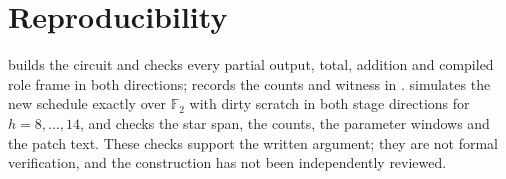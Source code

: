 \documentclass[11pt]{article}
\begin{document}
\section{Reproducibility}
 builds the circuit and checks every partial
output, total, addition and compiled role frame in both directions;
 records the counts and witness in
. 
simulates the new schedule exactly over $\mathbb F_2$ with dirty scratch in
both stage directions for $h=8,\ldots,14$, and checks the star span, the
counts, the parameter windows and the patch text. These checks support the
written argument; they are not formal verification, and the construction has
not been independently reviewed.
\end{document}
